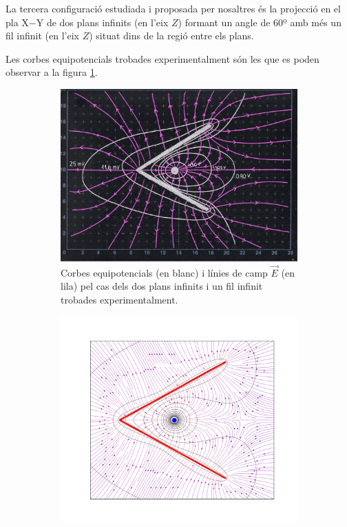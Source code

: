 \documentclass[a4paper,10.5pt]{report}
\begin{document}
La tercera configuració estudiada i proposada per nosaltres és la projecció en el pla X$-$Y de dos plans infinits (en l'eix $Z$) formant un angle de 60º amb més un fil infinit (en l'eix $Z$) situat dins de la regió entre els plans.

Les corbes equipotencials trobades experimentalment són les que es poden observar a la figura \ref{fig:1.4a}.

\begin{figure}[h]
	\centering
	\begin{subfigure}{0.49\linewidth}
		\centering
		\includegraphics[angle=90, width=\linewidth]{confinventJS}
		\caption{Corbes equipotencials (en blanc) i línies de camp $\vec{E}$ (en lila) pel cas dels dos plans infinits i un fil infinit trobades experimentalment.}
		\label{fig:1.4a}
	\end{subfigure}
	\hfill
	\begin{subfigure}{0.49\linewidth}
		\centering
		\includegraphics[width=\linewidth]{figplacarara}

\end{subfigure}
\end{figure}
\end{document}

